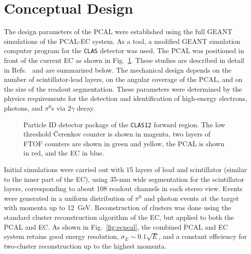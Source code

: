 \section{Conceptual Design}

The design parameters of the PCAL were established using the full GEANT 
simulations of the PCAL-EC system.  As a tool, a modified GEANT simulation 
computer program for the {\tt CLAS} detector was used.  The PCAL was 
positioned in front of the current EC as shown in Fig.~\ref{fig:clas12fwd}.  
These studies are described in detail in Refs.~\cite{natalia,whitlow} and are 
summarized below.  The mechanical design depends on the number of 
scintillator-lead layers, on the angular coverage of the PCAL, and on the 
size of the readout segmentation.  These parameters were determined by the 
physics requirements for the detection and identification of high-energy 
electrons, photons, and $\pi^0$s via $2\gamma$ decay.  

\begin{figure}[ht]
\vspace{100mm}
\caption{\small{Particle ID detector package of the {\tt CLAS12} forward
region.  The low threshold {\v C}erenkov counter is shown in magenta, two
layers of FTOF counters are shown in green and yellow, the PCAL is shown 
in red, and the EC in blue.}}  
\label{fig:clas12fwd} 
\end{figure}

Initial simulations were carried out with 15 layers of lead and 
scintillator (similar to the inner part of the EC), using 35-mm wide 
segmentation for the scintillator layers, corresponding to about 108 
readout channels in each stereo view.  Events were generated in a uniform 
distribution of $\pi^0$ and photon events at the target with momenta up 
to 12~GeV.  Reconstruction of clusters was done using the standard cluster 
reconstruction algorithm of the EC, but applied to both the PCAL and EC.  
As shown in Fig.~\ref{fig:ecpcal}, the combined PCAL and EC system retains 
good energy resolution, $\sigma_E \sim 0.1\sqrt E$, and a constant 
efficiency for two-cluster reconstruction up to the highest momenta. 

